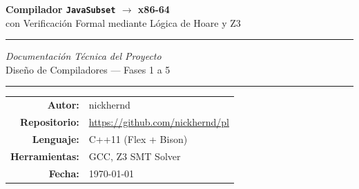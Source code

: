 \documentclass[12pt,a4paper,twoside,openright]{report}
\begin{document}
\begin{titlepage}
  \centering
  \vspace*{2cm}

  {\LARGE\bfseries Compilador \texttt{JavaSubset} $\rightarrow$ x86-64}\\[0.5em]
  {\large con Verificación Formal mediante Lógica de Hoare y Z3}

  \vspace{2cm}
  \rule{\textwidth}{0.5pt}
  \vspace{0.5cm}

  {\large\itshape Documentación Técnica del Proyecto}\\[0.3em]
  {\normalsize Diseño de Compiladores — Fases 1 a 5}

  \vspace{0.5cm}
  \rule{\textwidth}{0.5pt}

  \vfill

  \begin{tabular}{rl}
    \textbf{Autor:}      & nickhernd \\[0.3em]
    \textbf{Repositorio:} & \url{https://github.com/nickhernd/pl} \\[0.3em]
    \textbf{Lenguaje:}   & C++11 (Flex + Bison) \\[0.3em]
    \textbf{Herramientas:} & GCC, Z3 SMT Solver \\[0.3em]
    \textbf{Fecha:}      & \today \\
  \end{tabular}

  \vspace{2cm}
\end{titlepage}

\begin{abstract}
\noindent
Este documento describe el diseño e implementación de un compilador completo
para un subconjunto de Java con destino nativo x86-64. El compilador abarca
cinco milestones: análisis léxico-sintáctico con Flex y Bison, análisis
semántico con tablas de símbolos y verificación de tipos, generación de código
intermedio en formato de cuádruplas de tres direcciones, backend x86-64 con
generación de ensamblador AT\&T y asignación de registros mediante el
algoritmo de coloración de grafos de Chaitin-Briggs, y finalmente un módulo
de verificación formal basado en la Lógica de Hoare y el Cálculo de
Precondiciones Más Débiles (\emph{Weakest Precondition}, WP) con exportación
a formato SMT-Lib2 para el solver Z3.

El compilador es capaz de procesar programas Java anotados con especificaciones
formales (\texttt{@pre}, \texttt{@post}, \texttt{@invariant}, \texttt{@variant})
y generar automáticamente condiciones de verificación cuya validez es comprobada
por Z3, detectando así tanto corrección de programas como errores de
division por cero y no terminación.
\end{abstract}
\end{document}
